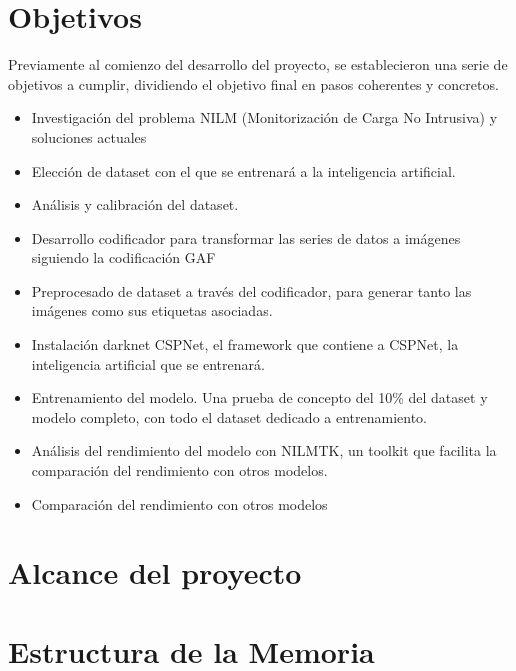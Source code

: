 \section{Objetivos}
\label{sec:objetivos}
Previamente al comienzo del desarrollo del proyecto, se establecieron una serie de objetivos a cumplir, dividiendo el objetivo final en pasos coherentes y concretos.
\begin{itemize}
	\item Investigación del problema NILM (Monitorización de Carga No Intrusiva) y soluciones actuales
	\item Elección de dataset con el que se entrenará a la inteligencia artificial.
	\item Análisis y calibración del dataset.
	\item Desarrollo codificador para transformar las series de datos a imágenes siguiendo la codificación GAF
	\item Preprocesado de dataset a través del codificador, para generar tanto las imágenes como sus etiquetas asociadas. 
	\item Instalación darknet CSPNet, el framework que contiene a CSPNet, la inteligencia artificial que se entrenará.
	\item Entrenamiento del modelo. Una prueba de concepto del 10\% del dataset y modelo completo, con todo el dataset dedicado a entrenamiento.
	\item Análisis del rendimiento del modelo con NILMTK, un toolkit que facilita la comparación del rendimiento con otros modelos. 
	\item Comparación del rendimiento con otros modelos
\end{itemize}

\section{Alcance del proyecto}
\label{sec:alcanceproyecto}
\section{Estructura de la Memoria}
\label{sec:estructuramemoria}
